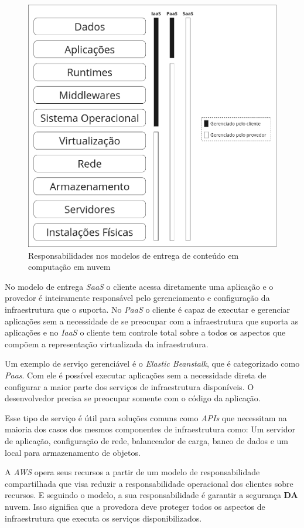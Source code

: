 \begin{figure}[H]
\captionsetup{width=.7\textwidth}%
\caption{Responsabilidades nos modelos de entrega de conteúdo em computação em nuvem}
\label{fig:deliveryModelResponsabilities}
\includegraphics[width=.7\textwidth]{capitulos/1-revisao-da-literatura/files/delivery-model-2.png}
\end{figure}

No modelo de entrega \textit{SaaS} o cliente acessa diretamente uma aplicação e o provedor é inteiramente responsável pelo gerenciamento e configuração da infraestrutura que o suporta. No \textit{PaaS} o cliente é capaz de executar e gerenciar aplicações sem a necessidade de se preocupar com a infraestrutura que suporta as aplicações e no \textit{IaaS} o cliente tem controle total sobre a todos os aspectos que compõem a representação virtualizada da infraestrutura. \citep{cloudcomputingcambridge}

Um exemplo de serviço gerenciável é o \textit{Elastic Beanstalk}, que é categorizado como \textit{Paas}. Com ele é possível executar aplicações sem a necessidade direta de configurar a maior parte dos serviços de infraestrutura disponíveis. O desenvolvedor precisa se preocupar somente com o código da aplicação.

Esse tipo de serviço é útil para soluções comuns como \textit{APIs} que necessitam na maioria dos casos dos mesmos componentes de infraestrutura como: Um servidor de aplicação, configuração de rede, balanceador de carga, banco de dados e um local para armazenamento de objetos.

A \textit{AWS} opera seus recursos a partir de um modelo de responsabilidade compartilhada que visa reduzir a responsabilidade operacional dos clientes sobre recursos. \citep{awssharedresponsibilitymodel} E seguindo o modelo, a sua responsabilidade é garantir a segurança \textbf{DA} nuvem. Isso significa que a provedora deve proteger todos os aspectos de infraestrutura que executa os serviços disponibilizados.

